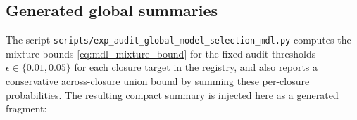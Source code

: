 \subsection{Generated global summaries}
\label{subsec:mdl_generated_summary}

The script \texttt{scripts/exp\_audit\_global\_model\_selection\_mdl.py} computes the mixture bounds \eqref{eq:mdl_mixture_bound} for the fixed audit thresholds $\epsilon\in\{0.01,0.05\}$ for each closure target in the registry, and also reports a conservative across-closure union bound by summing these per-closure probabilities.
The resulting compact summary is injected here as a generated fragment:
\begin{center}
\small
%
\end{center}


